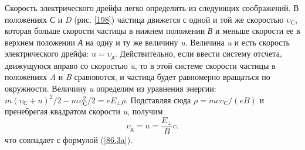 Скорость электрического дрейфа легко определить из следующих
соображений. В положениях \textit{С} и \textit{D} (рис. \ref{198}) частица движется с одной
и той же скоростью $\mathit{\upsilon}_\textit{С}$, которая больше скорости частицы в нижнем
положении \textit{В} и меньше скорости ее в верхнем положении \textit{А} на одну и ту
же величину \textit{u}. Величина \textit{u} и есть скорость электрического дрейфа:
$u = \upsilon_\text{д}$.
Действительно, если ввести систему отсчета, движущуюся вправо со скоростью \textit{u},
то в этой системе скорости частицы в положениях \textit{A} и \textit{B}
сравняются, и частица будет равномерно вращаться по окружности.
Величину \textit{u} определим из уравнения энергии: 
$m(\mathit{\upsilon}_\textit{С} + \textit{u})^2/2 - m\mathit{\upsilon}_\textit{С}^2/2 = eE_\perp \rho$.
Подставляя сюда $\rho = mc\mathit{\upsilon}_\textit{С}/(eB)$ и пренебрегая квадратом
скорости \textit{u}, получим
$$\upsilon_\text{д} = u = \frac{E_\perp}{B}c \text{.}$$
что совпадает с формулой (\ref{86.3a}).


